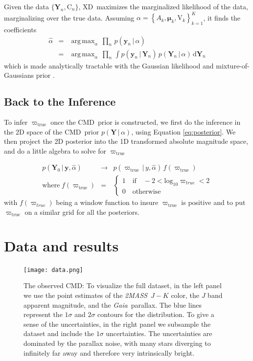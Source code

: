 \documentclass[modern]{aastex61}
\newcommand{\acronym}[1]{{\small{#1}}}
\newcommand{\project}[1]{\textsl{#1}}
\newcommand{\tmass}{\project{\acronym{2MASS}}}
\newcommand{\gaia}{\project{Gaia}}
\newcommand{\xd}{\acronym{XD}}
\newcommand{\cmd}{\acronym{CMD}}
\DeclareMathOperator*{\argmax}{arg\,max}
\newcommand{\given}{\,|\,}
\newcommand{\dd}{\mathrm{d}}
\newcommand{\true}{\mathrm{true}}
\renewcommand{\vec}[1]{\boldsymbol{{#1}}}
\newcommand{\truth}{\vec{Y}}
\newcommand{\data}{\vec{y}}
\newcommand{\mean}{\vec{\mu}}
\newcommand{\mat}[1]{{\mathrm{{#1}}}}
\newcommand{\var}{\mat{V}}
\newcommand{\covar}{\mat{C}}
\begin{document}
Given the data $\{ \truth_n, \covar_n\}$, \xd\ maximizes the marginalized likelihood of the data, marginalizing over the true data. Assuming $\alpha = \left\{A_k, \mean_k, \var_k\right\}_{k=1}^K$, it finds the coefficients
\begin{eqnarray}
\hat{\alpha} &=& \argmax_{\alpha} \, \prod_n \, p(\data_n \given \alpha) \nonumber\\
             &=& \argmax_{\alpha} \, \prod_n \, \int p(\data_n \given \truth_n) \, p(\truth_n \given \alpha)\, \dd\truth_n
\label{eq:xdmml}
\end{eqnarray}
which is made analytically tractable with the Gaussian likelihood and mixture-of-Gaussians prior \citep{bovy11}.

\subsection{Back to the Inference}

To infer $\varpi_{\true}$ once the \cmd\ prior is constructed, we first do the inference in the 2D space of the \cmd\ prior $p(\truth \given \alpha)$, using Equation \ref{eq:posterior}. We then project the 2D posterior into the 1D transformed absolute magnitude space, and do a little algebra to solve for $\varpi_{\true}$

\begin{eqnarray}
p(\truth_0 \given \data, \hat{\alpha}) &\rightarrow& p(\varpi_{\true} \given y, \hat{\alpha}) \, f(\varpi_{\true}) \\
\mathrm{where} \; f(\varpi_{\true}) &=& \begin{cases}
              1 \quad \mathrm{if} \quad -2 < \mathrm{log}_{10} \varpi_{true} < 2\\
              0 \quad \mathrm{otherwise}
              \end{cases}
\label{eq:parallaxPost}
\end{eqnarray}
with $f(\varpi_{true})$ being a window function to insure $\varpi_{\true}$ is positive and to put $\varpi_{\true}$ on a similar grid for all the posteriors.

\section{Data and results}
\begin{figure}
\centering
  \texttt{[image: data.png]}
\caption{The observed \cmd: To visualize the full dataset, in the left panel we use the point estimates of the \tmass\ $J-K$ color, the $J$ band apparent magnitude, and the \gaia\ parallax. The blue lines represent the $1\sigma$ and $2\sigma$ contours for the distribution. To give a sense of the uncertainties, in the right panel we subsample the dataset and include the $1\sigma$ uncertainties. The uncertainties are dominated by the parallax noise, with many stars diverging to infinitely far away and therefore very intrinsically bright.}
\label{fig:data}
\end{figure}
\end{document}
